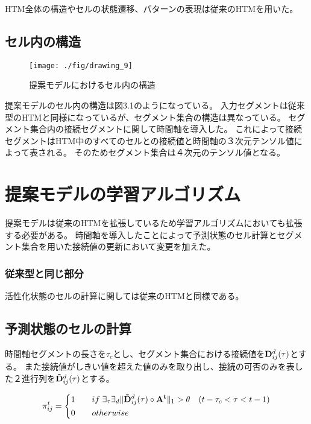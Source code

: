 HTM全体の構造やセルの状態遷移、パターンの表現は従来のHTMを用いた。

\subsection{セル内の構造}

\begin{figure}[ht]
  \begin{center}
    \texttt{[image: ./fig/drawing\_9]}
    \caption{提案モデルにおけるセル内の構造}
    \label{fig:HTM_improved}
  \end{center}
\end{figure}

提案モデルのセル内の構造は図3.1のようになっている。
入力セグメントは従来型のHTMと同様になっているが、セグメント集合の構造は異なっている。
セグメント集合内の接続セグメントに関して時間軸を導入した。
これによって接続セグメントはHTM中のすべてのセルとの接続値と時間軸の３次元テンソル値によって表される。
そのためセグメント集合は４次元のテンソル値となる。

\section{提案モデルの学習アルゴリズム}
提案モデルは従来のHTMを拡張しているため学習アルゴリズムにおいても拡張する必要がある。
時間軸を導入したことによって予測状態のセル計算とセグメント集合を用いた接続値の更新において変更を加えた。

\subsubsection{従来型と同じ部分}

活性化状態のセルの計算に関しては従来のHTMと同様である。

\subsection{予測状態のセルの計算}
時間軸セグメントの長さを$\tau_c$とし、セグメント集合における接続値を${\bf D}^d_{ij}(\tau)$とする。
また接続値がしきい値を超えた値のみを取り出し、接続の可否のみを表した２進行列を${\bf \tilde{D}}^d_{ij}(\tau)$とする。

\begin{equation}
  \pi^t_{ij} =
  \left\{
  \begin{alignedat}{2}
    1 \qquad &if \; \exists_\tau \exists_d\|{\bf \tilde{D}}^d_{ij}(\tau) \circ {\bf A^t}\|_1 > \theta \quad (t-\tau_c < \tau < t-1)\\
    0 \qquad &otherwise
  \end{alignedat}
  \right.
\end{equation}

